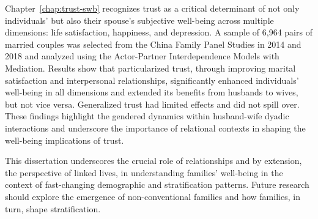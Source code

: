 Chapter~\ref{chap:trust-swb} recognizes trust as a critical determinant of not only individuals' but also their spouse's subjective well-being across multiple dimensions: life satisfaction, happiness, and depression. A sample of 6,964 pairs of married couples was selected from the China Family Panel Studies in 2014 and 2018 and analyzed using the Actor-Partner Interdependence Models with Mediation. Results show that particularized trust, through improving marital satisfaction and interpersonal relationships, significantly enhanced individuals' well-being in all dimensions and extended its benefits from husbands to wives, but not vice versa. Generalized trust had limited effects and did not spill over. These findings highlight the gendered dynamics within husband-wife dyadic interactions and underscore the importance of relational contexts in shaping the well-being implications of trust.

This dissertation underscores the crucial role of relationships and by extension, the perspective of linked lives, in understanding families' well-being in the context of fast-changing demographic and stratification patterns. Future research should explore the emergence of non-conventional families and how families, in turn, shape stratification.

\clearpage